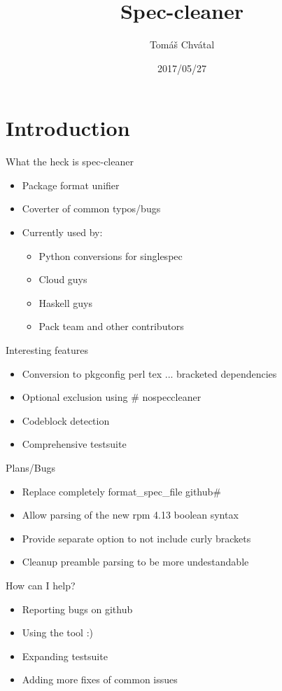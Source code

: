 \documentclass{beamer}
\author{Tom\'{a}\v{s} Chv\'{a}tal\newline {\small tchvatal@suse.com}\newline {\small Packaging/L3 - Packaging}}
\title{Spec-cleaner}
\date{2017/05/27}
\begin{document}
\begin{frame}[t,plain]
\titlepage
\end{frame}

\section{Introduction}

\begin{frame}[t]{What the heck is spec-cleaner}
	\begin{itemize}
	\item Package format unifier
	\item Coverter of common typos/bugs
	\item Currently used by:
		\begin{itemize}
		\item Python conversions for singlespec
		\item Cloud guys
		\item Haskell guys
		\item Pack team and other contributors
		\end{itemize}
	\end{itemize}
\end{frame}

\begin{frame}[t]{Interesting features}
	\begin{itemize}
	\item Conversion to pkgconfig perl tex ... bracketed dependencies
	\item Optional exclusion using # nospeccleaner
	\item Codeblock detection
	\item Comprehensive testsuite
	\end{itemize}
\end{frame}

\begin{frame}[t]{Plans/Bugs}
	\begin{itemize}
	\item Replace completely format\_spec\_file github#
	\item Allow parsing of the new rpm 4.13 boolean syntax
	\item Provide separate option to not include curly brackets
	\item Cleanup preamble parsing to be more undestandable
	\end{itemize}
\end{frame}


\begin{frame}[t]{How can I help?}
	\begin{itemize}
	\item Reporting bugs on github
	\item Using the tool :)
	\item Expanding testsuite
	\item Adding more fixes of common issues
	\end{itemize}
\end{frame}
\end{document}
